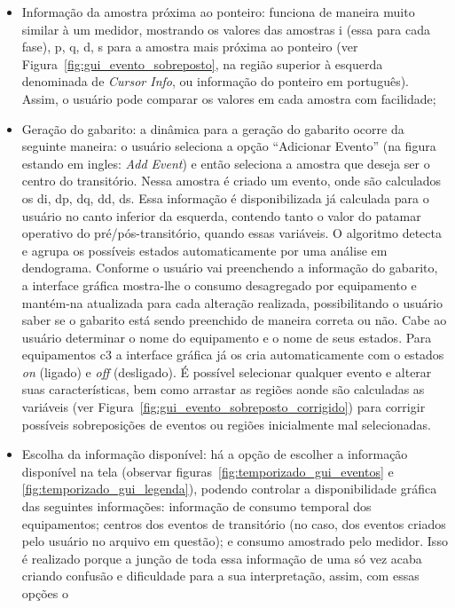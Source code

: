 \begin{itemize}
\item Informação da amostra próxima ao ponteiro: funciona de maneira
muito similar à um medidor, mostrando os valores das amostras \acs{i}
(essa para cada fase), \acs{p}, \acs{q}, \acs{d}, \acs{s} para a
amostra mais próxima ao ponteiro (ver
Figura~\ref{fig:gui_evento_sobreposto}, na região superior à esquerda
denominada de \emph{Cursor Info}, ou informação do ponteiro em
português). Assim, o usuário pode comparar os
valores em cada amostra com facilidade;
\item Geração do gabarito: a dinâmica para a geração do gabarito
ocorre da seguinte maneira: o usuário
seleciona a opção ``Adicionar Evento'' (na figura estando em ingles:
\emph{Add Event}) e então seleciona a amostra que deseja ser o centro
do transitório. Nessa amostra é criado um evento, onde são calculados
os \acs{di}, \acs{dp}, \acs{dq}, \acs{dd}, \acs{ds}. Essa informação é
disponibilizada já calculada para o usuário no canto inferior da
esquerda, contendo tanto o valor do patamar operativo do 
pré/pós-transitório, quando essas variáveis. O algoritmo
detecta e agrupa os possíveis estados automaticamente por uma análise
em dendograma. Conforme o usuário vai preenchendo a informação do
gabarito, a interface gráfica mostra-lhe o consumo desagregado por
equipamento e mantém-na atualizada para cada alteração realizada,
possibilitando o usuário saber se o gabarito está sendo preenchido de
maneira correta ou não. Cabe ao usuário determinar o nome do equipamento
e o nome de seus estados. Para equipamentos \acs{c3} a interface gráfica
já os cria automaticamente com o estados \emph{on} (ligado) e
\emph{off} (desligado). É possível selecionar qualquer evento e
alterar suas características, bem como arrastar as regiões aonde são
calculadas as variáveis (ver
Figura~\ref{fig:gui_evento_sobreposto_corrigido}) para corrigir
possíveis sobreposições de eventos ou regiões inicialmente mal
selecionadas.
\item Escolha da informação disponível: há a opção de escolher a
informação disponível na tela (observar
figuras~\ref{fig:temporizado_gui_eventos} e
\ref{fig:temporizado_gui_legenda}),
podendo controlar a disponibilidade gráfica das seguintes informações:
informação de consumo temporal dos equipamentos; centros dos eventos de
transitório (no caso, dos eventos criados pelo usuário no arquivo em
questão); e consumo amostrado pelo medidor. Isso é realizado porque a
junção de toda essa informação de uma só vez acaba criando confusão e
dificuldade para a sua interpretação, assim, com essas opções o

\end{itemize}
